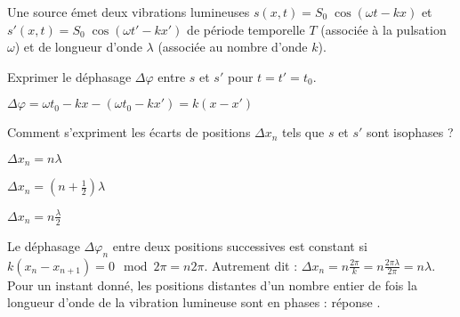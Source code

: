 \debutEntrainement



Une source émet deux vibrations lumineuses $s\left(x,t\right)=S_0 \; \cos \left(\omega t - k x\right)$ et $s'\left(x,t\right)=S_0 \; \cos \left(\omega t' - k x'\right)$ de période temporelle $T$ (associée à la pulsation $\omega$) et de longueur d'onde $\lambda$ (associée au nombre d'onde $k$).


\begin{enonce}
	Exprimer le déphasage $\Delta \varphi$ entre $s$ et $s'$ pour $t=t'=t_0$.
	\end{enonce}
	
	
	\begin{corrige}
	$\Delta \varphi = \omega t_0 - k x - \left( \omega t_0 - k x' \right) = k \left(x-x'\right)$
	\end{corrige}
	


\begin{enonce}
	Comment s'expriment les écarts de positions $\Delta x_n$ tels que $s$ et $s'$ sont isophases ? 
	\begin{listeQCM3Colonnes}
	\item $\Delta x_n = n \lambda$
	\item $\Delta x_n = \left(n+\frac{1}{2}\right) \lambda$
	\item $\Delta x_n = n \frac{\lambda}{2}$
	\end{listeQCM3Colonnes}
	\smallskip
\end{enonce}

\reponse{\reponseA{}}

\begin{corrige}
	Le déphasage $\Delta \varphi_n$ entre deux positions successives est constant si $k \left(x_n-x_{n+1}\right)= 0 \mod 2\pi = n 2\pi$. Autrement dit : $\Delta x_n = n\frac{2\pi}{k}= n\frac{2\pi \lambda}{2\pi}= n \lambda$. Pour un instant donné, les positions distantes d'un nombre entier de fois la longueur d'onde de la vibration lumineuse sont en phases : réponse \reponseA{}.
\end{corrige}

